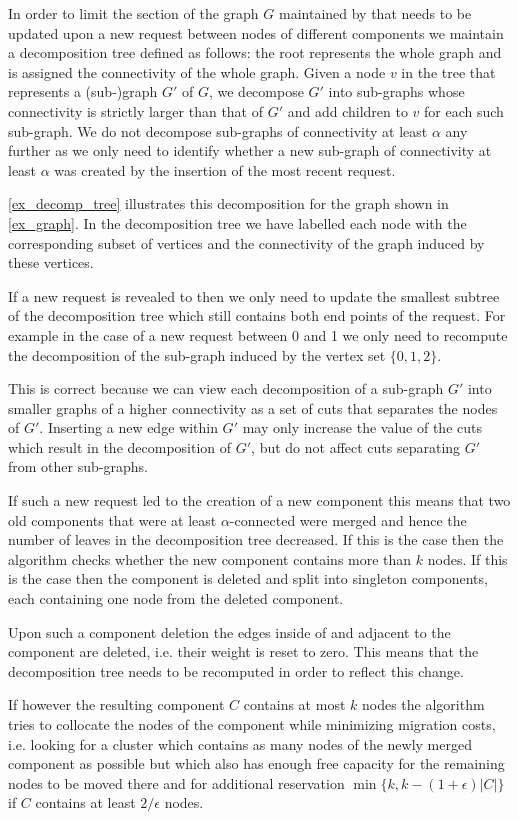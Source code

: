 \documentclass[a4paper,xcolor=dvipsnames, tikz, 12pt]{article}
\newcommand{\crep}{\text{C{\scriptsize REP}}}
\theoremstyle{definition}
\begin{document}
In order to limit the section of the graph $G$ maintained by \crep{} that needs to be updated upon a new request between nodes of different components we maintain a decomposition tree defined as follows: the root represents the whole graph and is assigned the connectivity of the whole graph. Given a node $v$ in the tree that represents a (sub-)graph $G'$ of $G$, we decompose $G'$ into sub-graphs whose connectivity is strictly larger than that of $G'$ and add children to $v$ for each such sub-graph. We do not decompose sub-graphs of connectivity at least $\alpha$ any further as we only need to identify whether a new sub-graph of connectivity at least $\alpha$ was created by the insertion of the most recent request.

\cref{ex_decomp_tree} illustrates this decomposition for the graph shown in \cref{ex_graph}. In the decomposition tree we have labelled each node with the corresponding subset of vertices and the connectivity of the graph induced by these vertices.

If a new request is revealed to \crep{} then we only need to update the smallest subtree of the decomposition tree which still contains both end points of the request. For example in the case of a new request between 0 and 1 we only need to recompute the decomposition of the sub-graph induced by the vertex set $\{0,1,2\}$. 

This is correct because we can view each decomposition of a sub-graph $G'$ into smaller graphs of a higher connectivity as a set of cuts that separates the nodes of $G'$. Inserting a new edge within $G'$ may only increase the value of the cuts which result in the decomposition of $G'$, but do not affect cuts separating $G'$ from other sub-graphs.

If such a new request led to the creation of a new component this means that two old components that were at least $\alpha$-connected were merged and hence the number of leaves in the decomposition tree decreased. If this is the case then the algorithm checks whether the new component contains more than $k$ nodes. If this is the case then the component is deleted and split into singleton components, each containing one node from the deleted component.

Upon such a component deletion the edges inside of and adjacent to the component are deleted, i.e. their weight is reset to zero. This means that the decomposition tree needs to be recomputed in order to reflect this change.

If however the resulting component $C$ contains at most $k$ nodes the algorithm tries to collocate the nodes of the component while minimizing migration costs, i.e. looking for a cluster which contains as many nodes of the newly merged component as possible but which also has enough free capacity for the remaining nodes to be moved there and for additional reservation $\min\{k, k-(1+\epsilon)|C|\}$ if $C$ contains at least $2/\epsilon$ nodes. %
\end{document}
